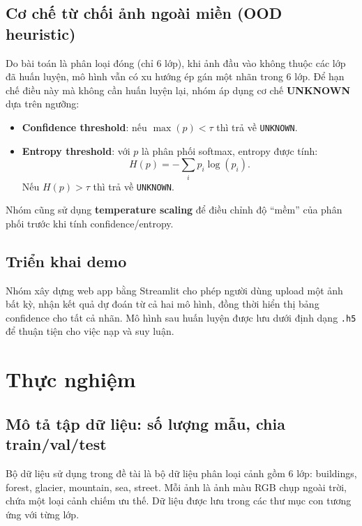 \documentclass[12pt,a4paper]{article}
\begin{document}
\subsection{Cơ chế từ chối ảnh ngoài miền (OOD heuristic)}
Do bài toán là phân loại đóng (chỉ 6 lớp), khi ảnh đầu vào không thuộc các lớp đã huấn luyện, mô hình vẫn có xu hướng ép gán một nhãn trong 6 lớp. Để hạn chế điều này mà không cần huấn luyện lại, nhóm áp dụng cơ chế \textbf{UNKNOWN} dựa trên ngưỡng:
\begin{itemize}
    \item \textbf{Confidence threshold}: nếu $\max(p) < \tau$ thì trả về \texttt{UNKNOWN}.
    \item \textbf{Entropy threshold}: với $p$ là phân phối softmax, entropy được tính:
    \begin{equation}
        H(p) = -\sum_i p_i \log(p_i).
    \end{equation}
    Nếu $H(p) > \tau$ thì trả về \texttt{UNKNOWN}.
\end{itemize}
Nhóm cũng sử dụng \textbf{temperature scaling} để điều chỉnh độ ``mềm'' của phân phối trước khi tính confidence/entropy.

\subsection{Triển khai demo}
Nhóm xây dựng web app bằng Streamlit cho phép người dùng upload một ảnh bất kỳ, nhận kết quả dự đoán từ cả hai mô hình, đồng thời hiển thị bảng confidence cho tất cả nhãn. Mô hình sau huấn luyện được lưu dưới định dạng \texttt{.h5} để thuận tiện cho việc nạp và suy luận.

\section{Thực nghiệm}\label{sec:thuc-nghiem}

\subsection{Mô tả tập dữ liệu: số lượng mẫu, chia train/val/test}
Bộ dữ liệu sử dụng trong đề tài là bộ dữ liệu phân loại cảnh gồm 6 lớp: buildings, forest, glacier, mountain, sea, street. Mỗi ảnh là ảnh màu RGB chụp ngoài trời, chứa một loại cảnh chiếm ưu thế. Dữ liệu được lưu trong các thư mục con tương ứng với từng lớp.
\end{document}
